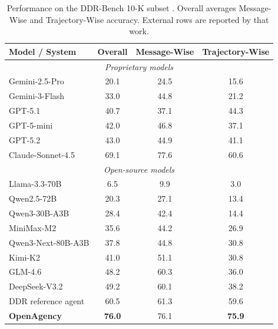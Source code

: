 \documentclass{article} %
\begin{document}
\begin{table}[t]
\caption{Performance on the DDR-Bench 10-K subset \citep{liu2026ddrbench}. Overall averages Message-Wise and Trajectory-Wise accuracy. External rows are reported by that work.}
\label{tab:ddr}
\begin{center}
\small
\setlength{\tabcolsep}{7pt}
\begin{tabular}{lccc}
\toprule
\textbf{Model / System} & \textbf{Overall} & \textbf{Message-Wise} & \textbf{Trajectory-Wise} \\
\midrule
\multicolumn{4}{c}{\emph{Proprietary models}} \\
Gemini-2.5-Pro & 20.1 & 24.5 & 15.6 \\
Gemini-3-Flash & 33.0 & 44.8 & 21.2 \\
GPT-5.1 & 40.7 & 37.1 & 44.3 \\
GPT-5-mini & 42.0 & 46.8 & 37.1 \\
GPT-5.2 & 43.0 & 44.9 & 41.1 \\
Claude-Sonnet-4.5 & 69.1 & 77.6 & 60.6 \\
\midrule
\multicolumn{4}{c}{\emph{Open-source models}} \\
Llama-3.3-70B & 6.5 & 9.9 & 3.0 \\
Qwen2.5-72B & 20.3 & 27.1 & 13.4 \\
Qwen3-30B-A3B & 28.4 & 42.4 & 14.4 \\
MiniMax-M2 & 35.6 & 44.2 & 26.9 \\
Qwen3-Next-80B-A3B & 37.8 & 44.8 & 30.8 \\
Kimi-K2 & 41.0 & 51.1 & 30.8 \\
GLM-4.6 & 48.2 & 60.3 & 36.0 \\
DeepSeek-V3.2 & 49.2 & 60.1 & 38.2 \\
\midrule
DDR reference agent & 60.5 & 61.3 & 59.6 \\
\rowcolor{gray!12}
\textbf{OpenAgency} & \textbf{76.0} & 76.1 & \textbf{75.9} \\
\bottomrule
\end{tabular}
\end{center}
\end{table}
\end{document}
